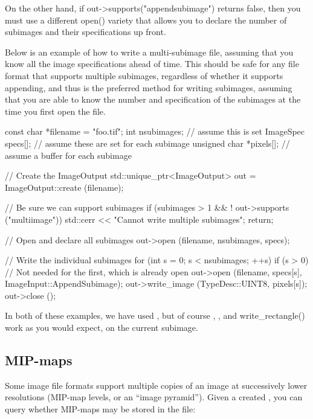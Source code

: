 On the other hand, if {\cf out->supports("appendsubimage")} returns
{\cf false}, then you must use a different {\cf open()} variety that
allows you to declare the number of subimages and their specifications
up front.

Below is an example of how to write a multi-subimage file, assuming that
you know all the image specifications ahead of time.  This should be
safe for any file format that supports multiple subimages, regardless of
whether it supports appending, and thus is the preferred method for
writing subimages, assuming that you are able to know the number and
specification of the subimages at the time you first open the file.

\begin{code}
        const char *filename = "foo.tif";
        int nsubimages;     // assume this is set
        ImageSpec specs[];  // assume these are set for each subimage
        unsigned char *pixels[]; // assume a buffer for each subimage

        // Create the ImageOutput
        std::unique_ptr<ImageOutput> out = ImageOutput::create (filename);

        // Be sure we can support subimages
        if (subimages > 1 && ! out->supports ("multiimage")) {
            std::cerr << "Cannot write multiple subimages\n";
            return;
        }

        // Open and declare all subimages
        out->open (filename, nsubimages, specs);

        // Write the individual subimages
        for (int s = 0;  s < nsubimages;  ++s) {
            if (s > 0)  // Not needed for the first, which is already open
                out->open (filename, specs[s], ImageInput::AppendSubimage);
            out->write_image (TypeDesc::UINT8, pixels[s]);
        }
        out->close ();
\end{code}

In both of these examples, we have used \writeimage, but of course
\writescanline, \writetile, and {\cf write_rectangle()} work as you
would expect, on the current subimage.


\subsection{MIP-maps}
\label{sec:imageoutput:mipmap}

Some image file formats support multiple copies of an image at successively
lower resolutions (MIP-map levels, or an ``image pyramid'').  Given a
created \ImageOutput, you can query whether MIP-maps may be
stored in the file:

